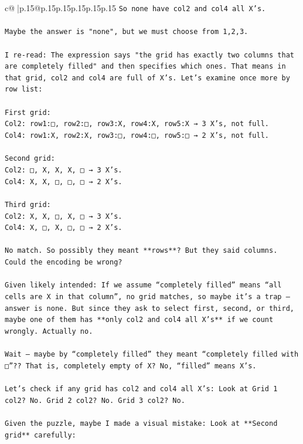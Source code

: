 \documentclass{article}
\begin{document}
{\begin{supertabular}{c@{$\;$}|p{.15\linewidth}@{}p{.15\linewidth}p{.15\linewidth}p{.15\linewidth}p{.15\linewidth}p{.15\linewidth}}
{{{\texttt{So none have col2 and col4 all X’s.} \\
\\ 
\texttt{Maybe the answer is "none", but we must choose from 1,2,3.  } \\
\\ 
\texttt{I re{-}read: The expression says "the grid has exactly two columns that are completely filled" and then specifies which ones. That means in that grid, col2 and col4 are full of X’s. Let’s examine once more by row list:} \\
\\ 
\texttt{First grid:  } \\
\texttt{Col2: row1:□, row2:□, row3:X, row4:X, row5:X → 3 X’s, not full.  } \\
\texttt{Col4: row1:X, row2:X, row3:□, row4:□, row5:□ → 2 X’s, not full.  } \\
\\ 
\texttt{Second grid:  } \\
\texttt{Col2: □, X, X, X, □ → 3 X’s.  } \\
\texttt{Col4: X, X, □, □, □ → 2 X’s.  } \\
\\ 
\texttt{Third grid:  } \\
\texttt{Col2: X, X, □, X, □ → 3 X’s.  } \\
\texttt{Col4: X, □, X, □, □ → 2 X’s.  } \\
\\ 
\texttt{No match. So possibly they meant **rows**? But they said columns. Could the encoding be wrong?  } \\
\\ 
\texttt{Given likely intended: If we assume “completely filled” means “all cells are X in that column”, no grid matches, so maybe it's a trap — answer is none. But since they ask to select first, second, or third, maybe one of them has **only col2 and col4 all X’s** if we count wrongly. Actually no.} \\
\\ 
\texttt{Wait — maybe by “completely filled” they meant “completely filled with □”?? That is, completely empty of X? No, “filled” means X’s.  } \\
\\ 
\texttt{Let’s check if any grid has col2 and col4 all X’s: Look at Grid 1 col2? No. Grid 2 col2? No. Grid 3 col2? No.} \\
\\ 
\texttt{Given the puzzle, maybe I made a visual mistake: Look at **Second grid** carefully:  } \\
}}}
\end{supertabular}}
\end{document}
